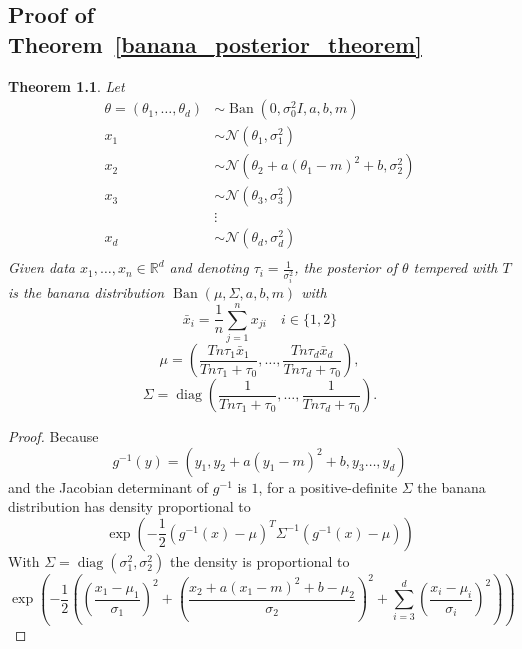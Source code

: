 \documentclass[english,twoside,openright]{HYgraduMLDS}
\newtheorem{theorem}[lemma]{Theorem}
\newcommand{\R}{\mathbb{R}}
\newcommand{\caln}{{\mathcal{N}}}
\DeclareMathOperator{\ban}{Ban}
\DeclareMathOperator{\diag}{diag}
\begin{document}
\begin{appendices}
\myappendixtitle

\chapter{Proof of Theorem~\ref{banana_posterior_theorem}}\label{banana_posterior_theorem_proof}

\setcounter{temp_counter}{\value{lemma}}
\setcounter{lemma}{\value{banana_posterior_theorem_number}}
\addtocounter{lemma}{-1}
\begin{theorem}
    Let
    \begin{align*}
        \theta = (\theta_1,\dotsc, \theta_d) &\sim
        \ban(0, \sigma_0^2I, a, b, m) \\
        x_1 &\sim \caln(\theta_1, \sigma_1^2) \\
        x_2 &\sim \caln(\theta_2 + a(\theta_1 - m)^2 + b, \sigma_2^2)\\
        x_3 &\sim \caln(\theta_3, \sigma_3^2) \\
            &\vdots \\
        x_d &\sim \caln(\theta_d, \sigma_d^2) \\
    \end{align*}
    Given data \(x_1,\dotsc, x_n\in \R^d\) and
    denoting \(\tau_i = \frac{1}{\sigma_i^2}\),
    the posterior of \(\theta\) tempered with \(T\) is the banana distribution
    \(\ban(\mu, \Sigma, a, b, m)\)
    with
    \[
        \bar{x}_i = \frac{1}{n}\sum_{j=1}^n x_{ji} \quad i\in \{1, 2\}
    \]
    \[
        \mu = \left(\frac{Tn\tau_1\bar{x}_1}{Tn\tau_1 + \tau_0},\dotsc,
        \frac{Tn\tau_d\bar{x}_d}{Tn\tau_d + \tau_0}\right),
    \]
    \[
        \Sigma = \diag\left(
            \frac{1}{Tn\tau_1 + \tau_0},\dotsc,
            \frac{1}{Tn\tau_d + \tau_0}
        \right).
    \]
\end{theorem}
\begin{proof}
    Because
    \[
    g^{-1}(y) = (y_1, y_2 + a(y_1 - m)^2 + b, y_3\dotsc, y_d)
    \]
    and the Jacobian determinant of \(g^{-1}\) is \(1\),
    for a positive-definite \(\Sigma\) the banana distribution has
    density proportional to
    \[
    \exp\left(-\frac{1}{2}(g^{-1}(x) - \mu)^T\Sigma^{-1}(g^{-1}(x) - \mu)\right)
    \]
    With \(\Sigma = \diag(\sigma_1^2, \sigma_2^2)\) the density is proportional
    to
    \[
    \exp
    \left(-\frac{1}{2}\left(\left(\frac{x_1 - \mu_1}{\sigma_1}\right)^2
    + \left(\frac{x_2 + a(x_1 - m)^2 + b - \mu_2}{\sigma_2}\right)^2
    + \sum_{i=3}^d\left(\frac{x_i - \mu_i}{\sigma_i}\right)^2\right)\right)
    \]


\end{proof}
\end{appendices}
\end{document}
